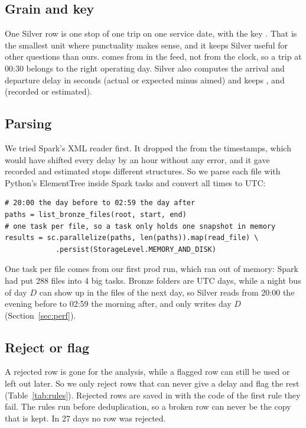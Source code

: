 \subsection*{Grain and key}

One Silver row is one stop of one trip on one service date, with the key
. That is the smallest unit where punctuality
makes sense, and it keeps Silver useful for other questions than ours. 
comes from  in the feed, not from the clock, so a trip at 00:30 belongs to
the right operating day. Silver also computes the arrival and departure delay in seconds
(actual or expected minus aimed) and keeps ,  and
 (recorded or estimated).

\subsection*{Parsing}

We tried Spark's XML reader first. It dropped the  from the timestamps, which
would have shifted every delay by an hour without any error, and it gave recorded and
estimated stops different structures. So we parse each file with Python's ElementTree inside
Spark tasks and convert all times to UTC:

\begin{lstlisting}
# 20:00 the day before to 02:59 the day after
paths = list_bronze_files(root, start, end)
# one task per file, so a task only holds one snapshot in memory
results = sc.parallelize(paths, len(paths)).map(read_file) \
            .persist(StorageLevel.MEMORY_AND_DISK)
\end{lstlisting}

One task per file comes from our first prod run, which ran out of memory: Spark had put 288
files into 4 big tasks. Bronze folders are UTC days, while a night bus of day $D$ can show up
in the files of the next day, so Silver reads from 20:00 the evening before to 02:59 the
morning after, and only writes day $D$ (Section~\ref{sec:perf}).

\subsection*{Reject or flag}

A rejected row is gone for the analysis, while a flagged row can still be used or left out
later. So we only reject rows that can never give a delay and flag the rest
(Table~\ref{tab:rules}). Rejected rows are saved in  with the code
of the first rule they fail. The rules run before deduplication, so a broken row can never be
the copy that is kept. In 27 days no row was rejected.

